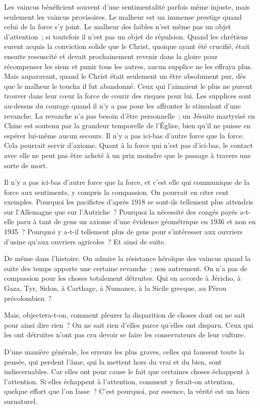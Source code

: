 \documentclass[french,twoside]{book} %
\begin{document}
Les vaincus bénéficient souvent d'une sentimentalité parfois même injuste, mais seulement les vaincus provisoires. Le malheur est un immense prestige quand celui de la force s'y joint. Le malheur des faibles n'est même pas un objet d'attention ; si toutefois il n'est pas un objet de répulsion. Quand les chrétiens eurent acquis la conviction solide que le Christ, quoique ayant été crucifié, était ensuite ressuscité et devait prochainement revenir dans la gloire pour récompenser les siens et punir tous les autres, aucun supplice ne les effraya plus. Mais auparavant, quand le Christ était seulement un être absolument pur, dès que le malheur le toucha il fut abandonné. Ceux qui l'aimaient le plus ne purent trouver dans leur cœur la force de courir des risques pour lui. Les supplices sont au-dessus du courage quand il n'y a pas pour les affronter le stimulant d'une revanche. La revanche n'a pas besoin d'être personnelle ; un Jésuite martyrisé en Chine est soutenu par la grandeur temporelle de l'Église, bien qu'il ne puisse en espérer lui-même aucun secours. Il n'y a pas ici-bas d'autre force que la force. Cela pourrait servir d'axiome. Quant à la force qui n'est pas d'ici-bas, le contact avec elle ne peut pas être acheté à un prix moindre que le passage à travers une sorte de mort.\par
Il n'y a pas ici-bas d'autre force que la force, et c'est elle qui communique de la force aux sentiments, y compris la compassion. On pourrait en citer cent exemples. Pourquoi les pacifistes d'après 1918 se sont-ils tellement plus attendris sur l'Allemagne que sur l'Autriche ? Pourquoi la nécessité des congés payés a-t-elle paru à tant de gens un axiome d'une évidence géométrique en 1936 et non en 1935 ? Pourquoi y a-t-il tellement plus de gens pour s'intéresser aux ouvriers d'usine qu'aux ouvriers agricoles ? Et ainsi de suite.\par
De même dans l'histoire. On admire la résistance héroïque des vaincus quand la suite des temps apporte une certaine revanche ; non autrement. On n'a pas de compassion pour les choses totalement détruites. Qui en accorde à Jéricho, à Gaza, Tyr, Sidon, à Carthage, à Numance, à la Sicile grecque, au Pérou précolombien ?\par
Mais, objectera-t-on, comment pleurer la disparition de choses dont on ne sait pour ainsi dire rien ? On ne sait rien d'elles parce qu'elles ont disparu. Ceux qui les ont détruites n'ont pas cru devoir se faire les conservateurs de leur culture.\par
D'une manière générale, les erreurs les plus graves, celles qui faussent toute la pensée, qui perdent l'âme, qui la mettent hors du vrai et du bien, sont indiscernables. Car elles ont pour cause le fait que certaines choses échappent à l'attention. Si elles échappent à l'attention, comment y ferait-on attention, quelque effort que l'on fasse ? C'est pourquoi, par essence, la vérité est un bien surnaturel.\par
\end{document}
